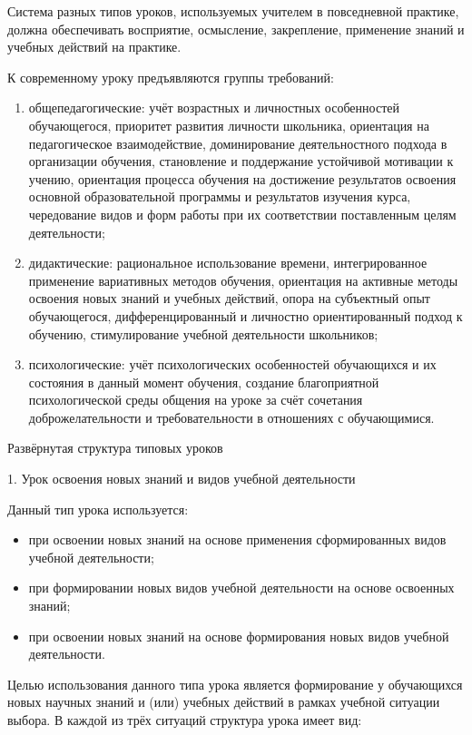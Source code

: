\documentclass[
  11pt,
  russian,
]{book}
\begin{document}
Система разных типов уроков, используемых учителем в повседневной
практике, должна обеспечивать восприятие, осмысление, закрепление,
применение знаний и учебных действий на практике.

К современному уроку предъявляются группы требований:

\begin{enumerate}
\def\labelenumi{\arabic{enumi})}
\item
  общепедагогические: учёт возрастных и личностных особенностей
  обучающегося, приоритет развития личности школьника, ориентация на
  педагогическое взаимодействие, доминирование деятельностного подхода в
  организации обучения, становление и поддержание устойчивой мотивации к
  учению, ориентация процесса обучения на достижение результатов
  освоения основной образовательной программы и результатов изучения
  курса, чередование видов и форм работы при их соответствии
  поставленным целям деятельности;
\item
  дидактические: рациональное использование времени, интегрированное
  применение вариативных методов обучения, ориентация на активные методы
  освоения новых знаний и учебных действий, опора на субъектный опыт
  обучающегося, дифференцированный и личностно ориентированный подход к
  обучению, стимулирование учебной деятельности школьников;
\item
  психологические: учёт психологических особенностей обучающихся и их
  состояния в данный момент обучения, создание благоприятной
  психологической среды общения на уроке за счёт сочетания
  доброжелательности и требовательности в отношениях с обучающимися.
\end{enumerate}

Развёрнутая структура типовых уроков

1. Урок освоения новых знаний и видов учебной деятельности

Данный тип урока используется:

\begin{itemize}
\item
  при освоении новых знаний на основе применения сформированных видов
  учебной деятельности;
\item
  при формировании новых видов учебной деятельности на основе освоенных
  знаний;
\item
  при освоении новых знаний на основе формирования новых видов учебной
  деятельности.
\end{itemize}

Целью использования данного типа урока является формирование у
обучающихся новых научных знаний и (или) учебных действий в рамках
учебной ситуации выбора. В каждой из трёх ситуаций структура урока имеет
вид:
\end{document}
